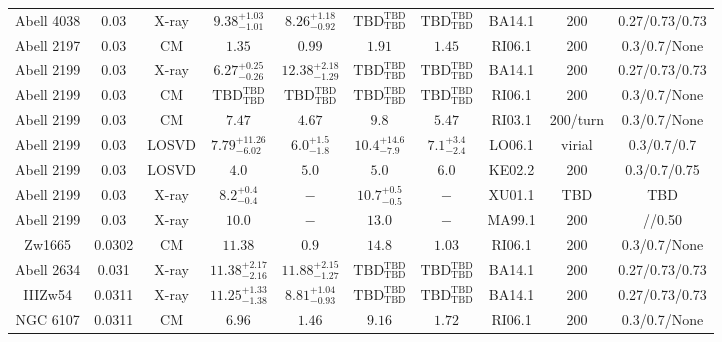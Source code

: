 \begin{table}
\begin{tabular}{cccccccccc}
Abell 4038 & 0.03 & X-ray & ${9.38}^{+1.03}_{-1.01}$ & ${8.26}^{+1.18}_{-0.92}$ & ${\mathrm{TBD}}^{\mathrm{TBD}}_{\mathrm{TBD}}$ & ${\mathrm{TBD}}^{\mathrm{TBD}}_{\mathrm{TBD}}$ & BA14.1 & 200 & 0.27/0.73/0.73 \\
Abell 2197 & 0.03 & CM & ${1.35}^{}_{}$ & ${0.99}^{}_{}$ & ${1.91}^{}_{}$ & ${1.45}^{}_{}$ & RI06.1 & 200 & 0.3/0.7/None \\
Abell 2199 & 0.03 & X-ray & ${6.27}^{+0.25}_{-0.26}$ & ${12.38}^{+2.18}_{-1.29}$ & ${\mathrm{TBD}}^{\mathrm{TBD}}_{\mathrm{TBD}}$ & ${\mathrm{TBD}}^{\mathrm{TBD}}_{\mathrm{TBD}}$ & BA14.1 & 200 & 0.27/0.73/0.73 \\
Abell 2199 & 0.03 & CM & ${\mathrm{TBD}}^{\mathrm{TBD}}_{\mathrm{TBD}}$ & ${\mathrm{TBD}}^{\mathrm{TBD}}_{\mathrm{TBD}}$ & ${\mathrm{TBD}}^{\mathrm{TBD}}_{\mathrm{TBD}}$ & ${\mathrm{TBD}}^{\mathrm{TBD}}_{\mathrm{TBD}}$ & RI06.1 & 200 & 0.3/0.7/None \\
Abell 2199 & 0.03 & CM & ${7.47}^{}_{}$ & ${4.67}^{}_{}$ & ${9.8}^{}_{}$ & ${5.47}^{}_{}$ & RI03.1 & 200/turn & 0.3/0.7/None \\
Abell 2199 & 0.03 & LOSVD & ${7.79}^{+11.26}_{-6.02}$ & ${6.0}^{+1.5}_{-1.8}$ & ${10.4}^{+14.6}_{-7.9}$ & ${7.1}^{+3.4}_{-2.4}$ & LO06.1 & virial & 0.3/0.7/0.7 \\
Abell 2199 & 0.03 & LOSVD & ${4.0}^{}_{}$ & ${5.0}^{}_{}$ & ${5.0}^{}_{}$ & ${6.0}^{}_{}$ & KE02.2 & 200 & 0.3/0.7/0.75 \\
Abell 2199 & 0.03 & X-ray & ${8.2}^{+0.4}_{-0.4}$ & ${-}^{}_{}$ & ${10.7}^{+0.5}_{-0.5}$ & ${-}^{}_{}$ & XU01.1 & TBD & TBD \\
Abell 2199 & 0.03 & X-ray & ${10.0}^{}_{}$ & ${-}^{}_{}$ & ${13.0}^{}_{}$ & ${-}^{}_{}$ & MA99.1 & 200 & //0.50 \\
Zw1665 & 0.0302 & CM & ${11.38}^{}_{}$ & ${0.9}^{}_{}$ & ${14.8}^{}_{}$ & ${1.03}^{}_{}$ & RI06.1 & 200 & 0.3/0.7/None \\
Abell 2634 & 0.031 & X-ray & ${11.38}^{+2.17}_{-2.16}$ & ${11.88}^{+2.15}_{-1.27}$ & ${\mathrm{TBD}}^{\mathrm{TBD}}_{\mathrm{TBD}}$ & ${\mathrm{TBD}}^{\mathrm{TBD}}_{\mathrm{TBD}}$ & BA14.1 & 200 & 0.27/0.73/0.73 \\
IIIZw54 & 0.0311 & X-ray & ${11.25}^{+1.33}_{-1.38}$ & ${8.81}^{+1.04}_{-0.93}$ & ${\mathrm{TBD}}^{\mathrm{TBD}}_{\mathrm{TBD}}$ & ${\mathrm{TBD}}^{\mathrm{TBD}}_{\mathrm{TBD}}$ & BA14.1 & 200 & 0.27/0.73/0.73 \\
NGC 6107 & 0.0311 & CM & ${6.96}^{}_{}$ & ${1.46}^{}_{}$ & ${9.16}^{}_{}$ & ${1.72}^{}_{}$ & RI06.1 & 200 & 0.3/0.7/None \\

\end{tabular}
\end{table}
